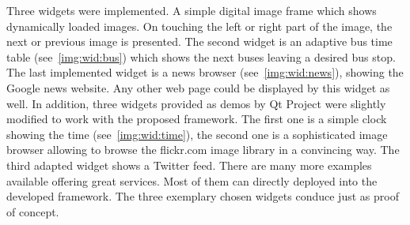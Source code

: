 Three widgets were implemented. A simple digital image frame which shows dynamically loaded images. On touching the left or right part of the image, the next or previous image is presented. The second widget is an adaptive bus time table (see~\autoref{img:wid:bus}) which shows the next buses leaving a desired bus stop. The last implemented widget is a news browser (see~\autoref{img:wid:news}), showing the Google news website. Any other web page could be displayed by this widget as well.
In addition, three widgets provided as demos by Qt Project were slightly modified to work with the proposed framework. The first one is a simple clock showing the time (see~\autoref{img:wid:time}), the second one is a sophisticated image browser allowing to browse the flickr.com image library in a convincing way. The third adapted widget shows a Twitter feed. There are many more examples available offering great services. Most of them can directly deployed into the developed framework. The three exemplary chosen widgets conduce just as proof of concept.